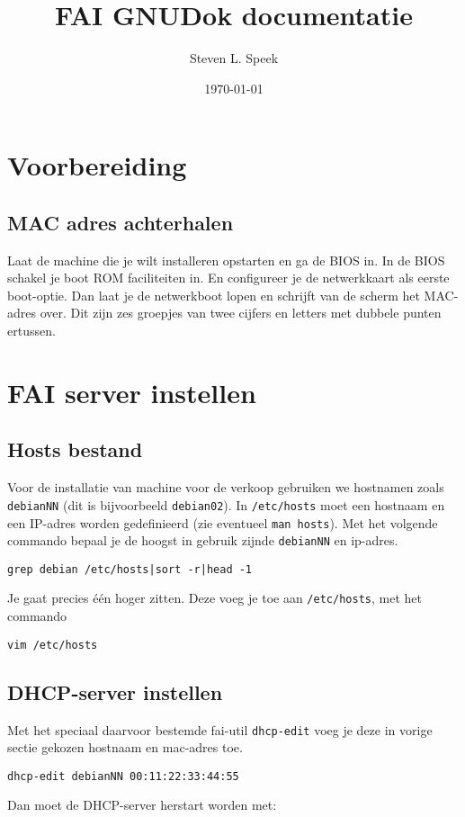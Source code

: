 \documentclass[12pt,a4paper]{article}
\begin{document}
\graphicspath{ {./images/} }
\lstset{language=bash}      
\author{Steven L. Speek}
\title{FAI GNUDok documentatie}
\date{\today}
\maketitle
{}

\section{Voorbereiding}
\subsection{MAC adres achterhalen}
Laat de machine die je wilt installeren opstarten en ga de BIOS in. In de BIOS schakel je boot ROM faciliteiten in. En configureer je de netwerkkaart als eerste boot-optie. Dan laat je de netwerkboot lopen en schrijft van de scherm het MAC-adres over. Dit zijn zes groepjes van twee cijfers en letters met dubbele punten ertussen. 

\section{FAI server instellen}
\subsection{Hosts bestand}
Voor de installatie van machine voor de verkoop gebruiken we hostnamen zoals \texttt{debianNN} (dit is bijvoorbeeld \texttt{debian02}).
In \texttt{/etc/hosts} moet een hostnaam en een IP-adres worden gedefinieerd (zie eventueel \texttt{man hosts}). Met het volgende commando bepaal je de hoogst in gebruik zijnde \texttt{debianNN} en ip-adres.  
\begin{lstlisting}
grep debian /etc/hosts|sort -r|head -1
\end{lstlisting}
Je gaat precies \'{e}\'{e}n hoger zitten. Deze voeg je toe aan \texttt{/etc/hosts}, met het commando
\begin{lstlisting}
vim /etc/hosts
\end{lstlisting}
\subsection{DHCP-server instellen}
Met het speciaal daarvoor bestemde fai-util \texttt{dhcp-edit} voeg je deze in vorige sectie gekozen hostnaam en mac-adres toe.
\begin{lstlisting}
dhcp-edit debianNN 00:11:22:33:44:55
\end{lstlisting}
Dan moet de DHCP-server herstart worden met:
\end{document}
